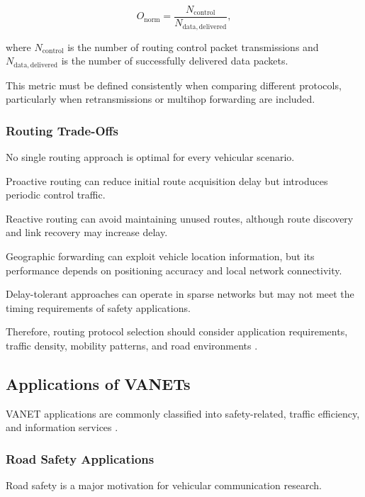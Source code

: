 \begin{equation}
O_{\mathrm{norm}} =
\frac{N_{\mathrm{control}}}
{N_{\mathrm{data,delivered}}},
\label{eq:routing_overhead}
\end{equation}

where $N_{\mathrm{control}}$
is the number of routing
control packet transmissions
and $N_{\mathrm{data,delivered}}$
is the number of successfully
delivered data packets.

This metric must be defined
consistently when comparing
different protocols,
particularly when
retransmissions or
multihop forwarding
are included.

\subsubsection{Routing Trade-Offs}

No single routing approach
is optimal for every
vehicular scenario.

Proactive routing
can reduce initial
route acquisition delay
but introduces periodic
control traffic.

Reactive routing
can avoid maintaining
unused routes, although
route discovery and
link recovery may
increase delay.

Geographic forwarding
can exploit vehicle
location information,
but its performance
depends on positioning
accuracy and local
network connectivity.

Delay-tolerant approaches
can operate in sparse
networks but may not
meet the timing
requirements of
safety applications.

Therefore, routing
protocol selection
should consider
application requirements,
traffic density,
mobility patterns,
and road environments
\cite{Karagiannis2011,Zeadally2012}.

\subsection{Applications of VANETs}
\label{sec:3b}

VANET applications
are commonly classified
into safety-related,
traffic efficiency,
and information services
\cite{Hartenstein2008}.

\subsubsection{Road Safety Applications}

Road safety is a major
motivation for vehicular
communication research.

